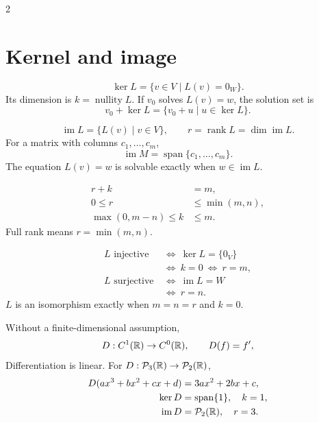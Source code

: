 \begin{fullwidth}
\begin{multicols}{2}
    \columnbreak
    \section{Kernel and image}
    \label{sec:appendix:formula-sheet-kernel-and-image}

    \[
      \ker L=\{v\in V\mid L(v)=0_W\}.
    \]
    Its dimension is \(k=\operatorname{nullity}L\).
    If \(v_0\) solves \(L(v)=w\), the solution set is
    \[
      v_0+\ker L=\{v_0+u\mid u\in\ker L\}.
    \]

    \[
      \operatorname{im}L=\{L(v)\mid v\in V\},\qquad
      r=\operatorname{rank}L=\dim\operatorname{im}L.
    \]
    For a matrix with columns \(c_1,\ldots,c_m\),
    \[
      \operatorname{im}M=\operatorname{span}\{c_1,\ldots,c_m\}.
    \]
    The equation \(L(v)=w\) is solvable exactly when
    \(w\in\operatorname{im}L\).

    \[
      \begin{aligned}
        r+k&=m,\\
        0\leq r&\leq\min(m,n),\\
        \max(0,m-n)\leq k&\leq m.
      \end{aligned}
    \]
    Full rank means \(r=\min(m,n)\).

    \[
      \begin{aligned}
        L\text{ injective}&\ \Longleftrightarrow\ \ker L=\{0_V\}\\
                         &\ \Longleftrightarrow\ k=0
                           \ \Longleftrightarrow\ r=m,\\
        L\text{ surjective}&\ \Longleftrightarrow\ \operatorname{im}L=W\\
                           &\ \Longleftrightarrow\ r=n.
      \end{aligned}
    \]
    \(L\) is an isomorphism exactly when \(m=n=r\) and \(k=0\).

    Without a finite-dimensional assumption,
    \[
      D:C^1(\mathbb{R})\to C^0(\mathbb{R}),\qquad D(f)=f',
    \]
    Differentiation is linear. For
    \(D:\mathcal P_3(\mathbb{R})\to\mathcal P_2(\mathbb{R})\),
    \[
      \begin{aligned}
        D(ax^3+bx^2+cx+d)&=3ax^2+2bx+c,\\
        \ker D&=\operatorname{span}\{1\},\quad k=1,\\
        \operatorname{im}D&=\mathcal P_2(\mathbb{R}),\quad r=3.
      \end{aligned}
    \]
  \end{multicols}
\end{fullwidth}
